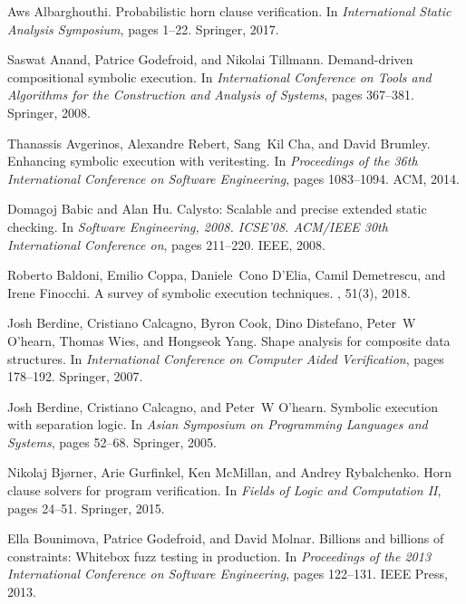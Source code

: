 \begin{thebibliography}{10}

Aws Albarghouthi.
\newblock Probabilistic horn clause verification.
\newblock In {\em International Static Analysis Symposium}, pages 1--22.
  Springer, 2017.

Saswat Anand, Patrice Godefroid, and Nikolai Tillmann.
\newblock Demand-driven compositional symbolic execution.
\newblock In {\em International Conference on Tools and Algorithms for the
  Construction and Analysis of Systems}, pages 367--381. Springer, 2008.

Thanassis Avgerinos, Alexandre Rebert, Sang~Kil Cha, and David Brumley.
\newblock Enhancing symbolic execution with veritesting.
\newblock In {\em Proceedings of the 36th International Conference on Software
  Engineering}, pages 1083--1094. ACM, 2014.

Domagoj Babic and Alan Hu.
\newblock Calysto: Scalable and precise extended static checking.
\newblock In {\em Software Engineering, 2008. ICSE'08. ACM/IEEE 30th
  International Conference on}, pages 211--220. IEEE, 2008.

Roberto Baldoni, Emilio Coppa, Daniele~Cono D'Elia, Camil Demetrescu, and Irene
  Finocchi.
\newblock A survey of symbolic execution techniques.
, 51(3), 2018.

Josh Berdine, Cristiano Calcagno, Byron Cook, Dino Distefano, Peter~W
  O’hearn, Thomas Wies, and Hongseok Yang.
\newblock Shape analysis for composite data structures.
\newblock In {\em International Conference on Computer Aided Verification},
  pages 178--192. Springer, 2007.

Josh Berdine, Cristiano Calcagno, and Peter~W O’hearn.
\newblock Symbolic execution with separation logic.
\newblock In {\em Asian Symposium on Programming Languages and Systems}, pages
  52--68. Springer, 2005.

Nikolaj Bj{\o}rner, Arie Gurfinkel, Ken McMillan, and Andrey Rybalchenko.
\newblock Horn clause solvers for program verification.
\newblock In {\em Fields of Logic and Computation II}, pages 24--51. Springer,
  2015.

Ella Bounimova, Patrice Godefroid, and David Molnar.
\newblock Billions and billions of constraints: Whitebox fuzz testing in
  production.
\newblock In {\em Proceedings of the 2013 International Conference on Software
  Engineering}, pages 122--131. IEEE Press, 2013.


\end{thebibliography}
